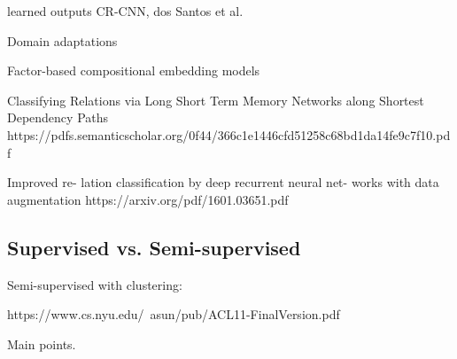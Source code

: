 learned outputs
CR-CNN, dos Santos et al.


Domain adaptations


Factor-based compositional embedding
models

Classifying Relations via Long Short Term Memory Networks
along Shortest Dependency Paths
https://pdfs.semanticscholar.org/0f44/366c1e1446cfd51258c68bd1da14fe9c7f10.pdf



Improved re- lation classification by deep recurrent neural net- works with data augmentation
https://arxiv.org/pdf/1601.03651.pdf


\subsection{Supervised vs. Semi-supervised}

Semi-supervised with clustering:

https://www.cs.nyu.edu/~asun/pub/ACL11-FinalVersion.pdf


Main points. 


    